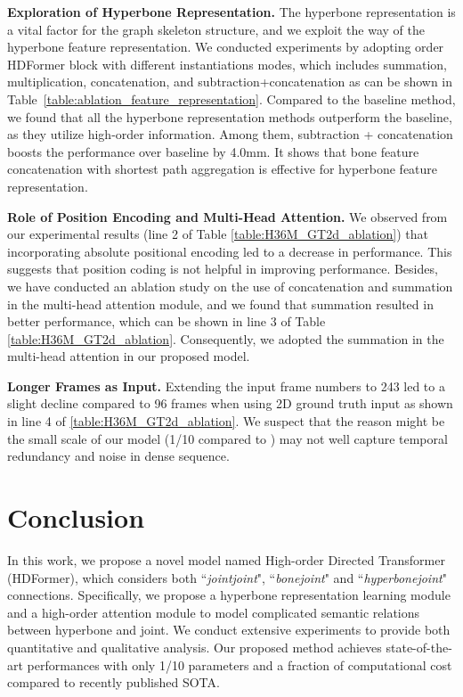 \documentclass{article}
\begin{document}
\noindent \textbf{Exploration of Hyperbone Representation.} The hyperbone representation is a vital factor for the graph skeleton structure, and we exploit the way of the hyperbone feature representation. We conducted experiments by adopting  order HDFormer block with different instantiations modes, which includes summation, multiplication, concatenation, and subtraction+concatenation as can be shown in Table~\ref{table:ablation_feature_representation}. Compared to the baseline method, we found that all the hyperbone representation methods outperform the baseline, as they utilize high-order information. Among them, subtraction + concatenation boosts the performance over baseline by 4.0mm. It shows that bone feature concatenation with shortest path aggregation is effective for hyperbone feature representation.


\noindent \textbf{Role of Position Encoding and Multi-Head Attention.} We observed from our experimental results (line 2 of Table \ref{table:H36M_GT2d_ablation}) that incorporating absolute positional encoding led to a decrease in performance. This suggests that position coding is not helpful in improving performance. Besides, we have conducted an ablation study on the use of concatenation and summation in the multi-head attention module, and we found that summation resulted in better performance, which can be shown in line 3 of Table \ref{table:H36M_GT2d_ablation}. Consequently, we adopted the summation in the multi-head attention in our proposed model.

\noindent \textbf{Longer Frames as Input.} Extending the input frame numbers to 243 led to a slight decline compared to 96 frames when using 2D ground truth input as shown in line 4 of \ref{table:H36M_GT2d_ablation}. We suspect that the reason might be the small scale of our model (1/10 compared to \cite{ZhangCVPR22MixSTE}) may not well capture temporal redundancy and noise in dense sequence.

\section{Conclusion}
In this work, we propose a novel model named High-order Directed Transformer (HDFormer), which considers both ``\textit{jointjoint}", ``\textit{bonejoint}" and ``\textit{hyperbonejoint}" connections. Specifically, we propose a hyperbone representation learning module and a high-order attention module to model complicated semantic relations between hyperbone and joint. We conduct extensive experiments to provide both quantitative and qualitative analysis. Our proposed method achieves state-of-the-art performances with only 1/10 parameters and a fraction of computational cost compared to recently published SOTA.
\end{document}
